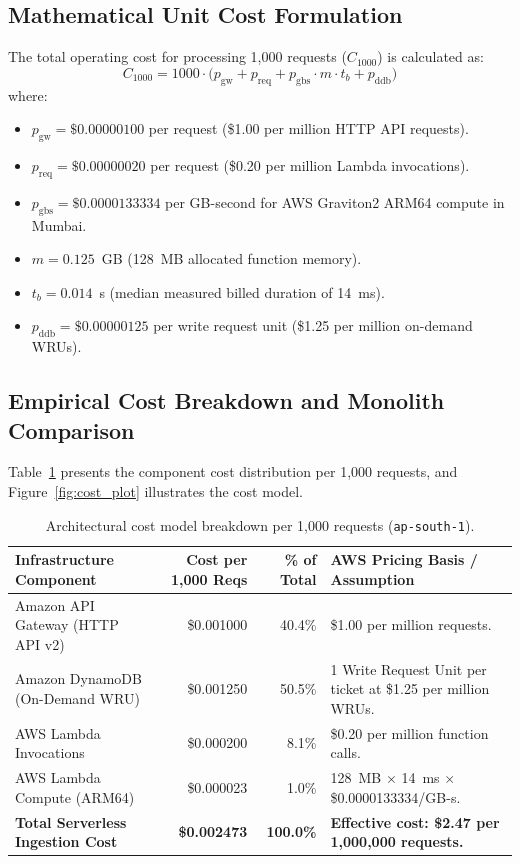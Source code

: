 \documentclass[10pt,a4paper]{article}
\begin{document}
\subsection{Mathematical Unit Cost Formulation}
The total operating cost for processing 1,000 requests ($C_{1000}$) is calculated as:
\begin{equation}
C_{1000} = 1000 \cdot \Big( p_{\text{gw}} + p_{\text{req}} + p_{\text{gbs}} \cdot m \cdot t_b + p_{\text{ddb}} \Big)
\label{eq:cost_model}
\end{equation}
where:
\begin{itemize}
    \item $p_{\text{gw}} = \$0.00000100$ per request (\$1.00 per million HTTP API requests).
    \item $p_{\text{req}} = \$0.00000020$ per request (\$0.20 per million Lambda invocations).
    \item $p_{\text{gbs}} = \$0.0000133334$ per GB-second for AWS Graviton2 ARM64 compute in Mumbai.
    \item $m = 0.125$~GB (128~MB allocated function memory).
    \item $t_b = 0.014$~s (median measured billed duration of 14~ms).
    \item $p_{\text{ddb}} = \$0.00000125$ per write request unit (\$1.25 per million on-demand WRUs).
\end{itemize}

\subsection{Empirical Cost Breakdown and Monolith Comparison}
Table~\ref{tab:cost_breakdown} presents the component cost distribution per 1,000 requests, and Figure~\ref{fig:cost_plot} illustrates the cost model.

\begin{table}[H]
\centering
\caption{Architectural cost model breakdown per 1,000 requests (\texttt{ap-south-1}).}
\label{tab:cost_breakdown}
\small
\begin{tabularx}{\textwidth}{l r r X}
\toprule
\textbf{Infrastructure Component} & \textbf{Cost per 1,000 Reqs} & \textbf{\% of Total} & \textbf{AWS Pricing Basis / Assumption} \\
\midrule
Amazon API Gateway (HTTP API v2) & \$0.001000 & 40.4\% & \$1.00 per million requests. \\
Amazon DynamoDB (On-Demand WRU) & \$0.001250 & 50.5\% & 1 Write Request Unit per ticket at \$1.25 per million WRUs. \\
AWS Lambda Invocations & \$0.000200 & 8.1\% & \$0.20 per million function calls. \\
AWS Lambda Compute (ARM64) & \$0.000023 & 1.0\% & 128~MB $\times$ 14~ms $\times$ \$0.0000133334/GB-s. \\
\midrule
\textbf{Total Serverless Ingestion Cost} & \textbf{\$0.002473} & \textbf{100.0\%} & \textbf{Effective cost: \$2.47 per 1,000,000 requests.} \\
\bottomrule
\end{tabularx}
\end{table}
\end{document}
